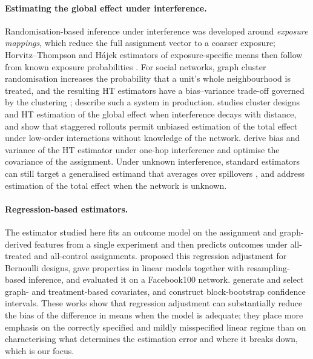 \paragraph{Estimating the global effect under interference.}
Randomisation-based inference under interference was developed around \emph{exposure mappings}, which reduce the full assignment vector to a coarser exposure; Horvitz--Thompson and H\'ajek estimators of exposure-specific means then follow from known exposure probabilities \citep{aronow2017estimating}. For social networks, graph cluster randomisation increases the probability that a unit's whole neighbourhood is treated, and the resulting HT estimators have a bias--variance trade-off governed by the clustering \citep{ugander2013graph,eckles2017design}; \citet{karrer2021network} describe such a system in production. \citet{leung2022rate} studies cluster designs and HT estimation of the global effect when interference decays with distance, and \citet{cortez2022staggered} show that staggered rollouts permit unbiased estimation of the total effect under low-order interactions without knowledge of the network. \citet{chen2023optimized} derive bias and variance of the HT estimator under one-hop interference and optimise the covariance of the assignment. Under unknown interference, standard estimators can still target a generalised estimand that averages over spillovers \citep{savje2021average}, and \citet{yu2022estimating} address estimation of the total effect when the network is unknown.

\paragraph{Regression-based estimators.}
The estimator studied here fits an outcome model on the assignment and graph-derived features from a single experiment and then predicts outcomes under all-treated and all-control assignments. \citet{chin2019regression} proposed this regression adjustment for Bernoulli designs, gave properties in linear models together with resampling-based inference, and evaluated it on a Facebook100 network. \citet{han2023model} generate and select graph- and treatment-based covariates, and construct block-bootstrap confidence intervals. These works show that regression adjustment can substantially reduce the bias of the difference in means when the model is adequate; they place more emphasis on the correctly specified and mildly misspecified linear regime than on characterising what determines the estimation error and where it breaks down, which is our focus.
